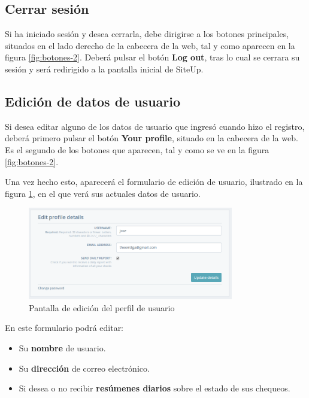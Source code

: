 \subsection{Cerrar sesión}

Si ha iniciado sesión y desea cerrarla, debe dirigirse a los botones
principales, situados en el lado derecho de la cabecera de la web, tal y como
aparecen en la figura \ref{fig:botones-2}. Deberá pulsar el botón \textbf{Log
  out}, tras lo cual se cerrara su sesión y será redirigido a la pantalla
inicial de SiteUp.

\subsection{Edición de datos de usuario}

Si desea editar alguno de los datos de usuario que ingresó cuando hizo el
registro, deberá primero pulsar el botón \textbf{Your profile}, situado en la
cabecera de la web. Es el segundo de los botones que aparecen, tal y como se ve
en la figura \ref{fig:botones-2}.

Una vez hecho esto, aparecerá el formulario de edición de usuario, ilustrado en
la figura \ref{fig:formulario-usuario}, en el que verá sus actuales datos de
usuario. 

\begin{figure}[hbtp]
  \centering
  \includegraphics[width=0.8\textwidth]{apendice_manual_usuario/pantalla_perfil_usuario.png}
  \caption{Pantalla de edición del perfil de usuario}
  \label{fig:formulario-usuario}
\end{figure}

En este formulario podrá editar:

\begin{itemize}
\item Su \textbf{nombre} de usuario.
\item Su \textbf{dirección} de correo electrónico.
\item Si desea o no recibir \textbf{resúmenes diarios} sobre el estado de sus chequeos.
\end{itemize}

